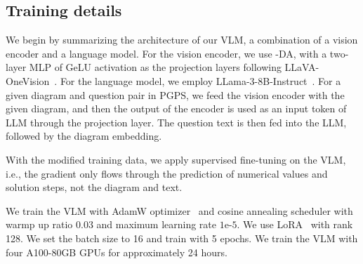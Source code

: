 
\subsection{Training details}
We begin by summarizing the architecture of our VLM, a combination of a vision encoder and a language model. For the vision encoder, we use \geoclip{}-DA, with a two-layer MLP of GeLU activation as the projection layers following LLaVA-OneVision~\citep{llava-next}. For the language model, we employ LLama-3-8B-Instruct~\citep{llama}.
For a given diagram and question pair in PGPS, we feed the vision encoder with the given diagram, and then the output of the encoder is used as an input token of LLM through the projection layer. The question text is then fed into the LLM, followed by the diagram embedding.

With the modified training data, we apply supervised fine-tuning on the VLM, i.e., the gradient only flows through the prediction of numerical values and solution steps, not the diagram and text.

We train the VLM with AdamW optimizer~\citep{adamw} and cosine annealing scheduler with warmp up ratio 0.03 and maximum learning rate $1\text{e-}5$.
We use LoRA~\citep{lora} with rank 128.
We set the batch size to 16 and train with 5 epochs.
We train the VLM with four A100-80GB GPUs for approximately 24 hours.



% 

